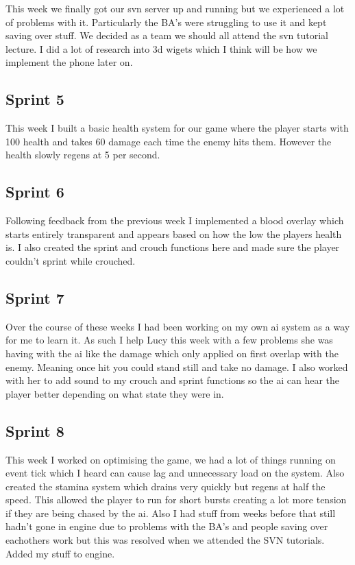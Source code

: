 \documentclass{scrartcl}
\begin{document}
This week we finally got our svn server up and running but we experienced a lot of problems with it. Particularly the BA's were struggling to use it and kept saving over stuff. We decided as a team we should all attend the svn tutorial lecture. I did a lot of research into 3d wigets which I think will be how we implement the phone later on.

\subsection*{Sprint 5}

This week I built a basic health system for our game where the player starts with 100 health and takes 60 damage each time the enemy hits them. However the health slowly regens at 5 per second.

\subsection*{Sprint 6}

Following feedback from the previous week I implemented a blood overlay which starts entirely transparent and appears based on how the low the players health is. I also created the sprint and crouch functions here and made sure the player couldn't sprint while crouched.

\subsection*{Sprint 7}

Over the course of these weeks I had been working on my own ai system as a way for me to learn it. As such I help Lucy this week with a few problems she was having with the ai like the damage which only applied on first overlap with the enemy. Meaning once hit you could stand still and take no damage. I also worked with her to add sound to my crouch and sprint functions so the ai can hear the player better depending on what state they were in.

\subsection*{Sprint 8}

This week I worked on optimising the game, we had a lot of things running on event tick which I heard can cause lag and unnecessary load on the system. Also created the stamina system which drains very quickly but regens at half the speed. This allowed the player to run for short bursts creating a lot more tension if they are being chased by the ai. Also I had stuff from weeks before that still hadn't gone in engine due to problems with the BA's and people saving over eachothers work but this was resolved when we attended the SVN tutorials. Added my stuff to engine.
\end{document}
